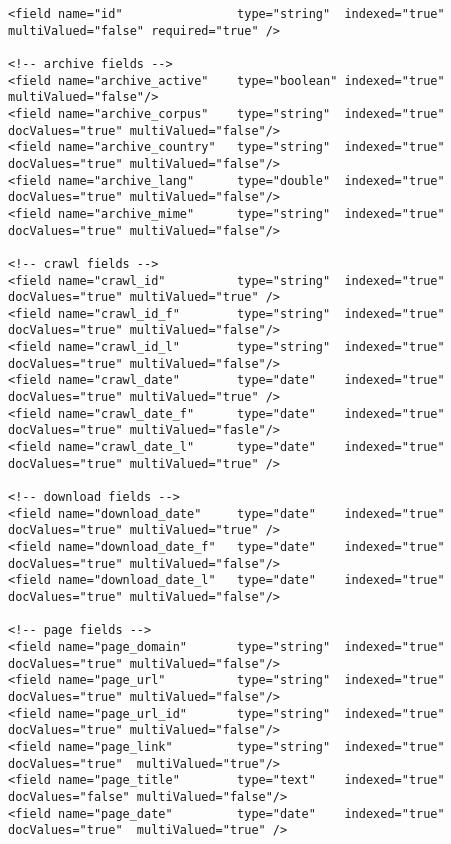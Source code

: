 \documentclass[symmetric,justified,marginals=raggedouter]{tufte-book}
\begin{document}
\begin{figure*}
\small
\begin{verbatim}
<field name="id"                type="string"  indexed="true"    multiValued="false" required="true" />

<!-- archive fields -->
<field name="archive_active"    type="boolean" indexed="true"    multiValued="false"/>
<field name="archive_corpus"    type="string"  indexed="true"    docValues="true" multiValued="false"/>
<field name="archive_country"   type="string"  indexed="true"    docValues="true" multiValued="false"/>
<field name="archive_lang"      type="double"  indexed="true"    docValues="true" multiValued="false"/>
<field name="archive_mime"      type="string"  indexed="true"    docValues="true" multiValued="false"/>  

<!-- crawl fields -->
<field name="crawl_id"          type="string"  indexed="true"    docValues="true" multiValued="true" />
<field name="crawl_id_f"        type="string"  indexed="true"    docValues="true" multiValued="false"/>
<field name="crawl_id_l"        type="string"  indexed="true"    docValues="true" multiValued="false"/>
<field name="crawl_date"        type="date"    indexed="true"    docValues="true" multiValued="true" />
<field name="crawl_date_f"      type="date"    indexed="true"    docValues="true" multiValued="fasle"/>
<field name="crawl_date_l"      type="date"    indexed="true"    docValues="true" multiValued="true" />

<!-- download fields -->
<field name="download_date"     type="date"    indexed="true"    docValues="true" multiValued="true" />
<field name="download_date_f"   type="date"    indexed="true"    docValues="true" multiValued="false"/>
<field name="download_date_l"   type="date"    indexed="true"    docValues="true" multiValued="false"/> 

<!-- page fields -->
<field name="page_domain"       type="string"  indexed="true"    docValues="true" multiValued="false"/>
<field name="page_url"          type="string"  indexed="true"    docValues="true" multiValued="false"/>
<field name="page_url_id"       type="string"  indexed="true"    docValues="true" multiValued="false"/>      
<field name="page_link"         type="string"  indexed="true"    docValues="true"  multiValued="true"/>      
<field name="page_title"        type="text"    indexed="true"    docValues="false" multiValued="false"/>
<field name="page_date"         type="date"    indexed="true"    docValues="true"  multiValued="true" />


\end{verbatim}
\end{figure*}
\end{document}

